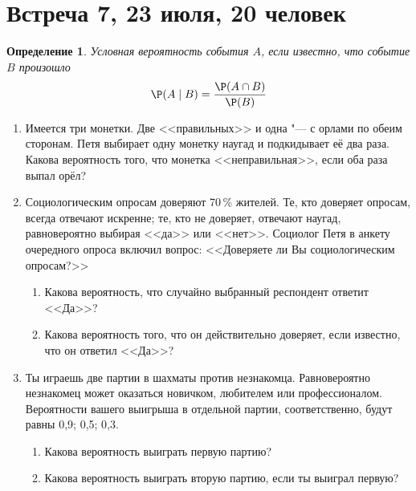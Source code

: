 \documentclass[pdftex,12pt,a4paper]{article}
\newtheorem*{defin}{Определение}
\begin{document}

\newpage
\section{Встреча 7, 23 июля, 20 человек}

\begin{defin}
Условная вероятность события $A$, если известно, что событие $B$ произошло
\[
\P(A\mid B) = \frac{\P(A\cap B)}{\P(B)}
\]

\end{defin}


\begin{enumerate}
\item Имеется три монетки. Две <<правильных>> и одна "--- с орлами по
обеим сторонам. Петя выбирает одну монетку наугад и подкидывает её
два раза. Какова вероятность того, что
монетка <<неправильная>>, если оба раза выпал орёл?
\item Социологическим опросам доверяют 70\,\% жителей. Те, кто доверяет опросам, всегда отвечают искренне; те, кто не доверяет, отвечают наугад, равновероятно выбирая <<да>> или <<нет>>. Социолог Петя  в анкету очередного опроса включил вопрос: <<Доверяете ли Вы социологическим опросам?>>
\begin{enumerate}
\item Какова вероятность, что случайно выбранный респондент ответит <<Да>>?
\item  Какова вероятность того, что он действительно доверяет, если известно, что он ответил <<Да>>?
\end{enumerate}

\item Ты играешь две партии в шахматы против незнакомца. Равновероятно
незнакомец может оказаться новичком, любителем или профессионалом.
Вероятности вашего выигрыша в отдельной партии, соответственно,
будут равны 0{,}9; 0{,}5; 0{,}3.
\begin{enumerate}
\item Какова вероятность выиграть первую партию?
\item Какова вероятность выиграть вторую партию, если ты выиграл
первую?
\end{enumerate}


\end{enumerate}
\end{document}
